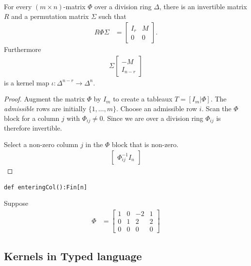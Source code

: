 \documentclass[12pt,twoside,dvipsnames,letterpaper]{memoir}
\begin{document}
\begin{proposition}
    For every $(m\times n)$-matrix $\Phi$ over a division ring $\Delta$,
    there is an invertible matrix 
    $R$ and a permutation matrix $\Sigma$ such that 
    \begin{align*}
        R\Phi \Sigma & = \begin{bmatrix}
            I_r & M \\
            0 & 0 
        \end{bmatrix}.
    \end{align*}
    Furthermore 
    \begin{align*}
        \Sigma \begin{bmatrix} -M\\ I_{n-r}\end{bmatrix}
    \end{align*}
    is a kernel map $\iota:\Delta^{n-r}\to \Delta^n$.
\end{proposition}
\begin{proof}
    Augment the matrix $\Phi$ by $I_m$ to create a tableaux
    $T=[I_m | \Phi]$.  
    The \emph{admissible} rows are initially $\{1,\ldots,m\}$.
    Choose an admissible row $i$.  Scan the $\Phi$ block for 
    a column $j$ with $\Phi_{ij}\neq 0$. Since we 
    are over a division ring $\Phi_{ij}$ is therefore invertible.


    Select a non-zero column $j$ in the $\Phi$ 
    block that is non-zero.  
    \begin{align*}
        \begin{bmatrix}
            \Phi_{ij}^{-1} I_n 
        \end{bmatrix}
    \end{align*}    
\end{proof}
\begin{lstlisting}[language=Sava]
def enteringCol():Fin[n]

\end{lstlisting}

Suppose 
\begin{align*}
    \Phi & = 
    \begin{bmatrix}
        1 & 0 & -2 & 1\\
        0 & 1 & 2 & 2\\
        0 & 0 & 0 & 0
    \end{bmatrix}
\end{align*}




\subsection{Kernels in Typed language}
\end{document}
